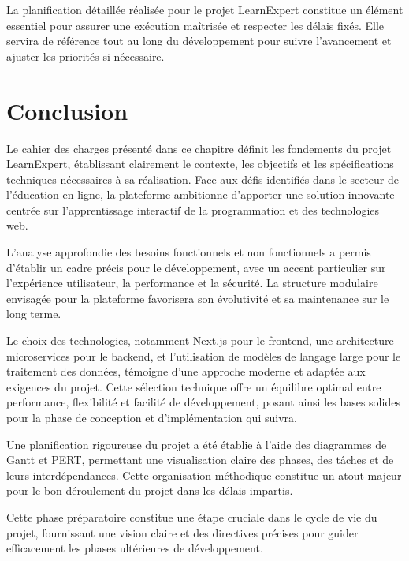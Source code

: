 La planification détaillée réalisée pour le projet LearnExpert constitue un élément essentiel pour assurer une exécution maîtrisée et respecter les délais fixés. Elle servira de référence tout au long du développement pour suivre l'avancement et ajuster les priorités si nécessaire.

\section{Conclusion}

Le cahier des charges présenté dans ce chapitre définit les fondements du projet LearnExpert, établissant clairement le contexte, les objectifs et les spécifications techniques nécessaires à sa réalisation. Face aux défis identifiés dans le secteur de l'éducation en ligne, la plateforme ambitionne d'apporter une solution innovante centrée sur l'apprentissage interactif de la programmation et des technologies web.

L'analyse approfondie des besoins fonctionnels et non fonctionnels a permis d'établir un cadre précis pour le développement, avec un accent particulier sur l'expérience utilisateur, la performance et la sécurité. La structure modulaire envisagée pour la plateforme favorisera son évolutivité et sa maintenance sur le long terme.

Le choix des technologies, notamment Next.js pour le frontend, une architecture microservices pour le backend, et l'utilisation de modèles de langage large pour le traitement des données, témoigne d'une approche moderne et adaptée aux exigences du projet. Cette sélection technique offre un équilibre optimal entre performance, flexibilité et facilité de développement, posant ainsi les bases solides pour la phase de conception et d'implémentation qui suivra.

Une planification rigoureuse du projet a été établie à l'aide des diagrammes de Gantt et PERT, permettant une visualisation claire des phases, des tâches et de leurs interdépendances. Cette organisation méthodique constitue un atout majeur pour le bon déroulement du projet dans les délais impartis.

Cette phase préparatoire constitue une étape cruciale dans le cycle de vie du projet, fournissant une vision claire et des directives précises pour guider efficacement les phases ultérieures de développement. 
